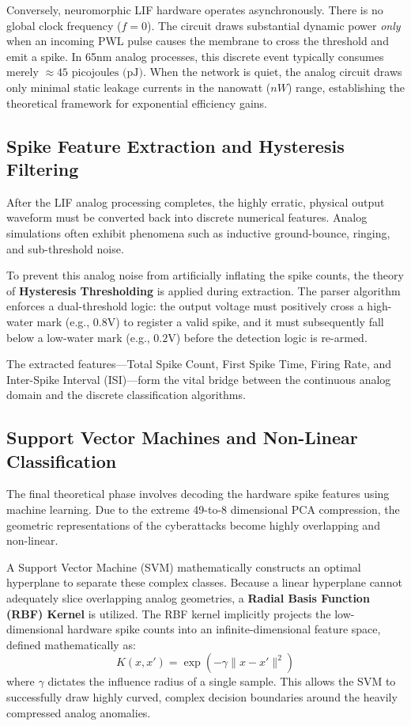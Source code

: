 \documentclass{ieeeaccess}
\begin{document}
Conversely, neuromorphic LIF hardware operates asynchronously. There is no global clock frequency ($f = 0$). The circuit draws substantial dynamic power \textit{only} when an incoming PWL pulse causes the membrane to cross the threshold and emit a spike. In 65nm analog processes, this discrete event typically consumes merely $\approx 45\text{ picojoules (pJ)}$. When the network is quiet, the analog circuit draws only minimal static leakage currents in the nanowatt ($nW$) range, establishing the theoretical framework for exponential efficiency gains.

\subsection{Spike Feature Extraction and Hysteresis Filtering}

After the LIF analog processing completes, the highly erratic, physical output waveform must be converted back into discrete numerical features. Analog simulations often exhibit phenomena such as inductive ground-bounce, ringing, and sub-threshold noise. 

To prevent this analog noise from artificially inflating the spike counts, the theory of \textbf{Hysteresis Thresholding} is applied during extraction. The parser algorithm enforces a dual-threshold logic: the output voltage must positively cross a high-water mark (e.g., $0.8\text{V}$) to register a valid spike, and it must subsequently fall below a low-water mark (e.g., $0.2\text{V}$) before the detection logic is re-armed. 

The extracted features—Total Spike Count, First Spike Time, Firing Rate, and Inter-Spike Interval (ISI)—form the vital bridge between the continuous analog domain and the discrete classification algorithms.

\subsection{Support Vector Machines and Non-Linear Classification}

The final theoretical phase involves decoding the hardware spike features using machine learning. Due to the extreme 49-to-8 dimensional PCA compression, the geometric representations of the cyberattacks become highly overlapping and non-linear. 

A Support Vector Machine (SVM) mathematically constructs an optimal hyperplane to separate these complex classes. Because a linear hyperplane cannot adequately slice overlapping analog geometries, a \textbf{Radial Basis Function (RBF) Kernel} is utilized. The RBF kernel implicitly projects the low-dimensional hardware spike counts into an infinite-dimensional feature space, defined mathematically as:
\begin{equation}
K(x, x') = \exp\left( -\gamma \|x - x'\|^2 \right)
\end{equation}
where $\gamma$ dictates the influence radius of a single sample. This allows the SVM to successfully draw highly curved, complex decision boundaries around the heavily compressed analog anomalies.
\end{document}
